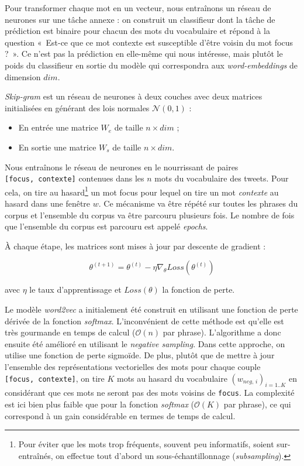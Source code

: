 \documentclass[10pt,french,french]{article}
\let\rmarkdownfootnote\footnote%
\def\footnote{\protect\rmarkdownfootnote}
\begin{document}
Pour transformer chaque mot en un vecteur, nous entraînons un réseau de neurones sur une tâche annexe : on construit un classifieur dont la tâche de prédiction est binaire pour chacun des mots du vocabulaire et répond à la question «~Est-ce que ce mot contexte est susceptible d'être voisin du mot focus ?~».
Ce n'est pas la prédiction en elle-même qui nous intéresse, mais plutôt le poids du classifieur en sortie du modèle qui correspondra aux \emph{word-embeddings} de dimension \(dim\).

\emph{Skip-gram} est un réseau de neurones à deux couches avec deux matrices initialisées en générant des lois normales \(\mathcal N(0,1)\) :

\begin{itemize}
\item
  En entrée une matrice \(W_e\) de taille \(n\times dim\) ;
\item
  En sortie une matrice \(W_s\) de taille \(n\times dim\).
\end{itemize}

Nous entraînons le réseau de neurones en le nourrissant de paires \texttt{{[}focus,\ contexte{]}} contenues dans les \(n\) mots du vocabulaire des tweets.
Pour cela, on tire au hasard\footnote{Pour éviter que les mots trop fréquents, souvent peu informatifs, soient sur-entraînés, on effectue tout d'abord un sous-échantillonnage (\emph{subsampling}).} un mot focus pour lequel on tire un mot \emph{contexte} au hasard dans une fenêtre \(w\).
Ce mécanisme va être répété sur toutes les phrases du corpus et l'ensemble du corpus va être parcouru plusieurs fois.
Le nombre de fois que l'ensemble du corpus est parcouru est appelé \emph{epochs}.

À chaque étape, les matrices sont mises à jour par descente de gradient :

\[\theta^{(t+1)} = \theta^{(t)} - \eta \nabla_\theta Loss(\theta^{(t)})\]

avec \(\eta\) le taux d'apprentissage et \(Loss(\theta)\) la fonction de perte.

Le modèle \emph{word2vec} a initialement été construit en utilisant une fonction de perte dérivée de la fonction \emph{softmax}.
L'inconvénient de cette méthode est qu'elle est très gourmande en temps de calcul (\(\mathcal O(n)\) par phrase).
L'algorithme a donc ensuite été amélioré en utilisant le \emph{negative sampling}.
Dans cette approche, on utilise une fonction de perte sigmoïde. De plus, plutôt que de mettre à jour l'ensemble des représentations vectorielles des mots pour chaque couple \texttt{{[}focus,\ contexte{]}}, on tire \(K\) mots au hasard du vocabulaire \((w_{neg,\,i})_{i=1..K}\) en considérant que ces mots ne seront pas des mots voisins de \texttt{focus}.
La complexité est ici bien plus faible que pour la fonction \emph{softmax} (\(\mathcal O(K)\) par phrase), ce qui correspond à un gain considérable en termes de temps de calcul.
\end{document}
